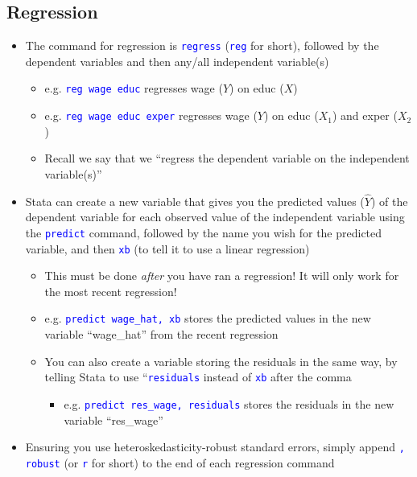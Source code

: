 \documentclass{article}
\begin{document}
\subsection{Regression}
\begin{itemize}
	\item The command for regression is \textcolor{blue}{\texttt{regress}} (\texttt{\textcolor{blue}{reg}} for short), followed by the dependent variables and then any/all independent variable(s)
	\begin{itemize}
		\item e.g. \textcolor{blue}{\texttt{reg wage educ}} regresses wage ($Y$) on educ ($X$)
		\item e.g. \textcolor{blue}{\texttt{reg wage educ exper}} regresses wage ($Y$) on educ ($X_1$) and exper ($X_2$)
		\item Recall we say that we ``regress the dependent variable on the independent variable(s)''
	\end{itemize}
	\item Stata can create a new variable that gives you the predicted values ($\hat{Y}$) of the dependent variable for each observed value of the independent variable using the \textcolor{blue}{\texttt{predict}} command, followed by the name you wish for the predicted variable, and then \textcolor{blue}{\texttt{xb}} (to tell it to use a linear regression)
		\begin{itemize}
		\item This must be done \emph{after} you have ran a regression! It will only work for the most recent regression!
		\item e.g. \textcolor{blue}{\texttt{predict wage\_hat, xb}} stores the predicted values in the new variable ``wage\_hat'' from the recent regression  
		\item You can also create a variable storing the residuals in the same way, by telling Stata to use ``\textcolor{blue}{\texttt{residuals}} instead of \textcolor{blue}{\texttt{xb}} after the comma
		\begin{itemize}
		\item e.g. \textcolor{blue}{\texttt{predict res\_wage, residuals}} stores the residuals in the new variable ``res\_wage''
	\end{itemize}
	\end{itemize}
	\item Ensuring you use heteroskedasticity-robust standard errors, simply append \textcolor{blue}{\texttt{, robust}} (or \textcolor{blue}{\texttt{r}} for short) to the end of each regression command 

\end{itemize}
\end{document}

